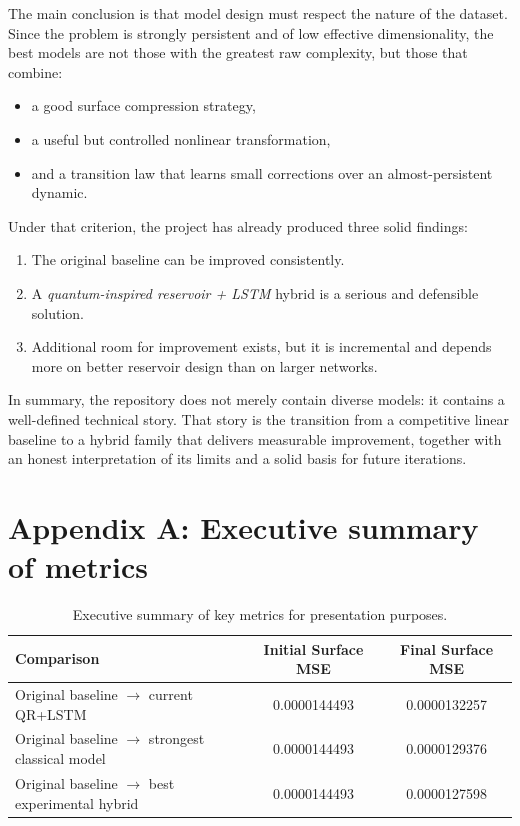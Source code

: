 \documentclass[11pt,a4paper]{article}
\begin{document}
The main conclusion is that model design must respect the nature of the dataset. Since the problem is strongly persistent and of low effective dimensionality, the best models are not those with the greatest raw complexity, but those that combine:

\begin{itemize}
    \item a good surface compression strategy,
    \item a useful but controlled nonlinear transformation,
    \item and a transition law that learns small corrections over an almost-persistent dynamic.
\end{itemize}

Under that criterion, the project has already produced three solid findings:

\begin{enumerate}[label=\arabic*.]
    \item The original baseline can be improved consistently.
    \item A \textit{quantum-inspired reservoir + LSTM} hybrid is a serious and defensible solution.
    \item Additional room for improvement exists, but it is incremental and depends more on better reservoir design than on larger networks.
\end{enumerate}

In summary, the repository does not merely contain diverse models: it contains a well-defined technical story. That story is the transition from a competitive linear baseline to a hybrid family that delivers measurable improvement, together with an honest interpretation of its limits and a solid basis for future iterations.

\section*{Appendix A: Executive summary of metrics}

\begin{table}[H]
\centering
\caption{Executive summary of key metrics for presentation purposes.}
\begin{tabular}{lcc}
\toprule
\textbf{Comparison} & \textbf{Initial Surface MSE} & \textbf{Final Surface MSE} \\
\midrule
Original baseline $\rightarrow$ current QR+LSTM & 0.0000144493 & 0.0000132257 \\
Original baseline $\rightarrow$ strongest classical model & 0.0000144493 & 0.0000129376 \\
Original baseline $\rightarrow$ best experimental hybrid & 0.0000144493 & 0.0000127598 \\
\bottomrule
\end{tabular}
\end{table}
\end{document}
